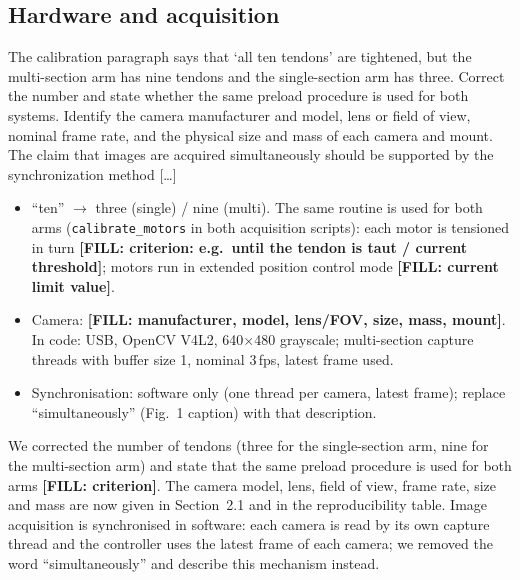 \documentclass[10pt,a4paper]{article}
\newcommand{\FILL}[1]{\textcolor{orange!85!black}{\textbf{[FILL: #1]}}}
\begin{document}
\subsection{Hardware and acquisition}\label{sec:hw}
\begin{rev}
The calibration paragraph says that `all ten tendons' are tightened, but the multi-section arm has nine tendons and the single-section arm has three. Correct the number and state whether the same preload procedure is used for both systems. Identify the camera manufacturer and model, lens or field of view, nominal frame rate, and the physical size and mass of each camera and mount. The claim that images are acquired simultaneously should be supported by the synchronization method [\dots]
\end{rev}
\begin{todo}
\begin{itemize}
\item ``ten'' $\rightarrow$ three (single) / nine (multi). The same routine is used for both arms (\texttt{calibrate\_motors} in both acquisition scripts): each motor is tensioned in turn \FILL{criterion: e.g.\ until the tendon is taut / current threshold}; motors run in extended position control mode \FILL{current limit value}.
\item Camera: \FILL{manufacturer, model, lens/FOV, size, mass, mount}. In code: USB, OpenCV V4L2, 640$\times$480 grayscale; multi-section capture threads with buffer size 1, nominal 3\,fps, latest frame used.
\item Synchronisation: software only (one thread per camera, latest frame); replace ``simultaneously'' (Fig.~1 caption) with that description.
\end{itemize}
\end{todo}
\begin{resp}
We corrected the number of tendons (three for the single-section arm, nine for the multi-section arm) and state that the same preload procedure is used for both arms \FILL{criterion}. The camera model, lens, field of view, frame rate, size and mass are now given in Section~2.1 and in the reproducibility table. Image acquisition is synchronised in software: each camera is read by its own capture thread and the controller uses the latest frame of each camera; we removed the word ``simultaneously'' and describe this mechanism instead.
\end{resp}
\end{document}
